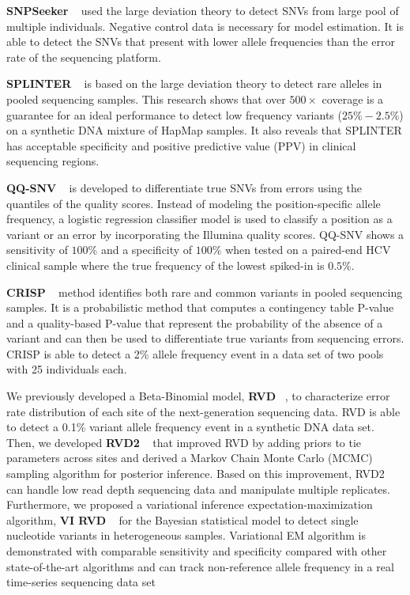 \documentclass[11pt,reqno]{amsart}
\begin{document}
\textbf{SNPSeeker} ~\citep{Druley2009} used the large deviation theory to detect SNVs from large pool of multiple individuals.
Negative control data is necessary for model estimation.
It is able to detect the SNVs that present with lower allele frequencies than the error rate of the sequencing platform.

\textbf{SPLINTER} ~\citep{Spencer2014} is based on the large deviation theory to detect rare alleles in pooled sequencing samples.
This research shows that over $500 \times$ coverage is a guarantee for an ideal performance to detect low frequency variants ($25\% - 2.5\%$) on a synthetic DNA mixture of HapMap samples.
It also reveals that SPLINTER has acceptable specificity and positive predictive value (PPV) in clinical sequencing regions.

\textbf{QQ-SNV} ~\citep{VanderBorght2015} is developed to differentiate true SNVs from errors using the quantiles of the quality scores.
Instead of modeling the position-specific allele frequency, a logistic regression classifier model is used to classify a position as a variant or an error by incorporating the Illumina quality scores.
QQ-SNV shows a sensitivity of $100\%$ and a specificity of $100\%$ when tested on a paired-end HCV clinical sample where the true frequency of the lowest spiked-in is $0.5\%$.


\textbf{CRISP} ~\citep{Bansal2010} method identifies both rare and common variants in pooled sequencing samples.
It is a probabilistic method that computes a contingency table P-value and a quality-based P-value that represent the probability of the absence of a variant and can then be used to differentiate true variants from sequencing errors.
CRISP is able to detect a 2\% allele frequency event in a data set of two pools with 25 individuals each.


We previously developed a Beta-Binomial model, \textbf{RVD} ~\citep{Flaherty2012}, to characterize error rate distribution of each site of the next-generation sequencing data.
RVD is able to detect a 0.1\% variant allele frequency event in a synthetic DNA data set.
Then, we developed \textbf{RVD2} ~\citep{He2015} that improved RVD by adding priors to tie parameters across sites and derived a Markov Chain Monte Carlo (MCMC) sampling algorithm for posterior inference.
Based on this improvement, RVD2 can handle low read depth sequencing data and manipulate multiple replicates.
Furthermore, we proposed a variational inference expectation-maximization algorithm, \textbf{VI RVD} ~\citep{zhang2016variational} for the Bayesian statistical model to detect single nucleotide variants in heterogeneous samples.
Variational EM algorithm is demonstrated with comparable sensitivity and specificity compared with other state-of-the-art algorithms and can track non-reference allele frequency in a real time-series sequencing data set
\end{document}
